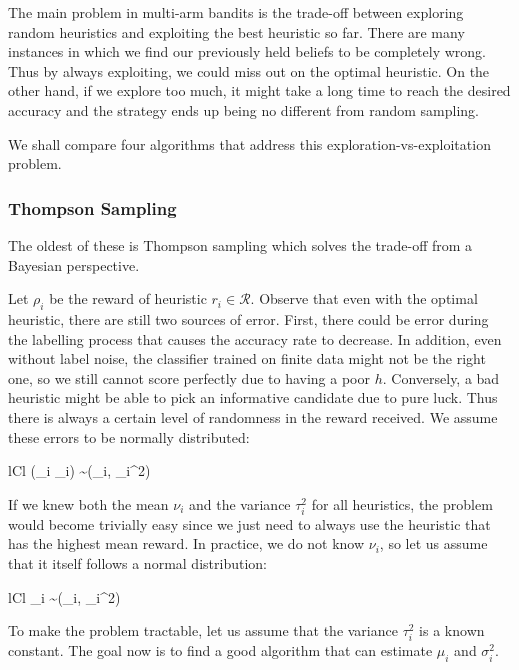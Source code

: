 \documentclass[fleqn,10pt,lineno]{wlpeerj} %
\newcommand{\Normal}{\mathcal{N}}
\newcommand{\R}{\mathcal{R}}
\begin{document}
The main problem in multi-arm bandits is the trade-off between exploring random
heuristics and exploiting the best heuristic so far. There are many instances
in which we find our previously held beliefs to be completely wrong. Thus by
always exploiting, we could miss out on the optimal heuristic. On the other
hand, if we explore too much, it might take a long time to reach the desired
accuracy and the strategy ends up being no different from random sampling.

We shall compare four algorithms that address this exploration-vs-exploitation
problem.

\subsubsection*{Thompson Sampling}

The oldest of these is Thompson sampling \citep{thompson33} which solves the
trade-off from a Bayesian perspective.

Let $\rho_i$ be the reward of heuristic $r_i \in \R$. Observe
that even with the optimal heuristic, there are still two sources of error.
First, there could be error during the labelling process that causes the
accuracy rate to decrease. In addition, even without label noise, the
classifier trained on finite data might not be the right one, so we still
cannot score perfectly due to having a poor $h$. Conversely, a bad heuristic
might be able to pick an informative candidate due to pure luck. Thus there is
always a certain level of randomness in the reward received. We assume these
errors to be normally distributed:
	\begin{IEEEeqnarray*}{lCl}
		(\rho_i \mid \nu_i) \sim \Normal(\nu_i, \tau_i^2)
	\end{IEEEeqnarray*}

If we knew both the mean $\nu_i$ and the variance $\tau_i^2$ for all
heuristics, the problem would become trivially easy since we just need to
always use the heuristic that has the highest mean reward. In practice, we do
not know $\nu_i$, so let us assume that it itself follows a normal
distribution:
	\begin{IEEEeqnarray*}{lCl}
        \nu_i \sim \Normal(\mu_i, \sigma_i^2)
    \end{IEEEeqnarray*}

To make the problem tractable, let us assume that the variance $\tau_i^2$ is a
known constant. The goal now is to find a good algorithm that can estimate
$\mu_i$ and $\sigma_i^2$.
\end{document}
